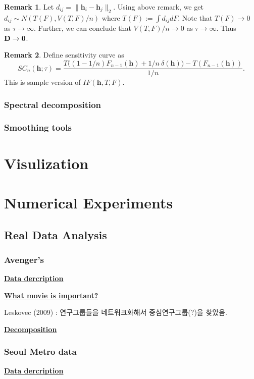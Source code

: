 \documentclass[preprint, review, 12pt]{article}
\theoremstyle{definition}
\newtheorem{rmk}{Remark}[section]
\theoremstyle{remark}
\begin{document}
\begin{rmk}
Let $d_{ij}=\|{\boldsymbol h}_i-{\boldsymbol h}_j\|_2$. Using above remark, we get $d_{ij} \sim N(T(F),V(T,F)/n)$ where $T(F):=\int d_{ij}dF$. Note that $T(F) \to 0 $ as $\tau \to \infty$. Further, we can conclude that $V(T,F)/n \to 0$ as $\tau \to \infty$. Thus ${\bf D} \to {\bf 0}$. 
\end{rmk}

\begin{rmk}
Define sensitivity curve as 
\[
SC_{n}({\boldsymbol h};\tau)= \frac{T\big((1-1/n)F_{n-1}(\boldsymbol{h}) + 1/n ~ \delta(\boldsymbol{h}) \big)-T(F_{n-1}(\boldsymbol{h}))}{1/n}.
\]
This is sample version of $IF({\boldsymbol h},T,F)$.
\end{rmk}

\subsubsection{Spectral decomposition}

\subsubsection{Smoothing tools}


\section{Visulization}

\section{Numerical Experiments}

\subsection{Real Data Analysis}
\subsubsection{Avenger's}
\noindent\textbf{\underline{Data dercription}}

\noindent\textbf{\underline{What movie is important?}}

Leskovec (2009) : 연구그룹들을 네트워크화해서 중심연구그룹(?)을 찾았음. 

\noindent\textbf{\underline{Decomposition}}


\subsubsection{Seoul Metro data}
\noindent\textbf{\underline{Data dercription}}
\end{document}
